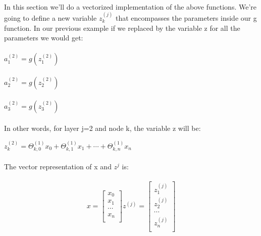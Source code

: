 \documentclass[UTF8]{ctexart}
\begin{document}
\paragraph{}
In this section we'll do a vectorized implementation of the above functions. We're going to define a new variable $ z_{k}^{(j)} $ that encompasses the parameters inside our g function. In our previous example if we replaced by the variable z for all the parameters we would get:
\begin{algorithm}
\paragraph{}
$ a_{1}^{(2)} =g(z_{1}^{(2)})$
\paragraph{}
$ a_{2}^{(2)} =g(z_{2}^{(2)})$
\paragraph{}
$ a_{3}^{(2)} =g(z_{3}^{(2)})$
\end{algorithm}
\paragraph{}
In other words, for layer j=2 and node k, the variable z will be:
\begin{algorithm}
$ z_{k}^{(2)}=\Theta_{k,0}^{(1)}x_{0}+ \Theta_{k,1}^{(1)}x_{1}+\cdots+\Theta_{k,n}^{(1)}x_{n}$
\end{algorithm}
\paragraph{}
The vector representation of x and $z^{j}$ is:
\paragraph{}
\begin{algorithm}
\begin{equation}
x=\left[\begin{array}{c}
x_{0}\\
x_{1}\\
\cdots\\
x_{n}\\
\end{array}\right] z^{(j)}=\left[\begin{array}{c}
z_{1}^{(j)}\\
z_{2}^{(j)}\\
\cdots\\
z_{n}^{(j)}\\
\end{array}\right]
\end{equation}
\end{algorithm}
\newpage
\end{document}
